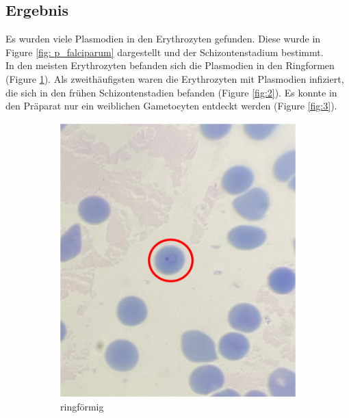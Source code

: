 \documentclass[oneside,10pt,a4paper]{report}
\begin{document}
			\subsection{Ergebnis}
				Es wurden viele Plasmodien in den Erythrozyten gefunden. Diese wurde in Figure \ref{fig: p_falciparum} dargestellt und der Schizontenstadium bestimmt.\\
				In den meisten Erythrozyten befanden sich die Plasmodien in den Ringformen (Figure \ref{fig:1}). Als zweithäufigsten waren die Erythrozyten mit Plasmodien infiziert, die sich in den frühen Schizontenstadien befanden (Figure \ref{fig:2}). Es konnte in den Präparat nur ein weiblichen Gametocyten entdeckt werden (Figure \ref{fig:3}).
				\begin{figure}[H]
					\centering
					\begin{subfigure}[b]{0.3\textwidth}
						\includegraphics[width=\textwidth]{plas3.png}
						\caption{ringförmig}
						\label{fig:1}
					\end{subfigure}
					\hfill
					\begin{subfigure}[b]{0.3\textwidth}

\end{subfigure}
\end{figure}
\end{document}
